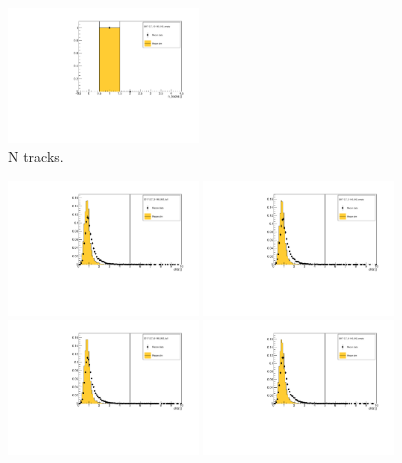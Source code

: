 \begin{figure}[!tbh]
    \includegraphics*[width=0.45\textwidth]{02-Cuts/Figures/2017-2.7_10-140_lH2_empty/tku_n_tracks_us_cut.pdf}
    \caption{N tracks. \label{fig:n_tof0_sp}}
\end{figure}

\begin{figure}[!tbh]
    \centering
    \includegraphics*[width=0.45\textwidth]{02-Cuts/Figures/2017-2.7_3-140_lH2_full/tku_chi2_us_cut.pdf}
    \includegraphics*[width=0.45\textwidth]{02-Cuts/Figures/2017-2.7_3-140_lH2_empty/tku_chi2_us_cut.pdf}
    \includegraphics*[width=0.45\textwidth]{02-Cuts/Figures/2017-2.7_6-140_lH2_full/tku_chi2_us_cut.pdf}
    \includegraphics*[width=0.45\textwidth]{02-Cuts/Figures/2017-2.7_6-140_lH2_empty/tku_chi2_us_cut.pdf}

\end{figure}
